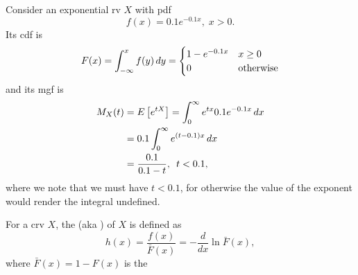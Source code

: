 \documentclass[notoc,notitlepage]{tufte-book}
\begin{document}
\begin{eg}
  Consider an exponential rv $X$ with pdf
  \begin{equation*}
    f(x) = 0.1e^{-0.1x}, \; x > 0.
  \end{equation*}
  Its cdf is
  \begin{equation*}
    F(x) = \int_{-\infty}^{x} f(y) \mathop{}\!d{y} = \begin{cases}
      1 - e^{-0.1 x} & x \geq 0 \\
      0              & \text{otherwise}
    \end{cases}
  \end{equation*}
  and its mgf is
  \begin{align*}
    M_X(t) &= E\left[ e^{tX} \right] = \int_{0}^{\infty} e^{tx} 0.1 e^{-0.1x} \mathop{}\!d{x} \\
           &= 0.1 \int_{0}^{\infty} e^{( t - 0.1 )x} \mathop{}\!d{x} \\
           &= \frac{0.1}{0.1 - t}, \enspace t < 0.1,
  \end{align*}
  where we note that we must have $t < 0.1$, for otherwise the value of the exponent would render the integral undefined.
\end{eg}

\begin{defn}\label{defn:hazard_rate_function}
  For a crv $X$, the  (aka ) of $X$ is defined as
  \begin{equation*}
    h(x) = \frac{f(x)}{\bar{F}(x)} = - \frac{d}{dx} \ln \bar{F}(x),
  \end{equation*}
  where $\bar{F}(x) = 1 - F(x)$ is the 
\end{defn}
\end{document}
